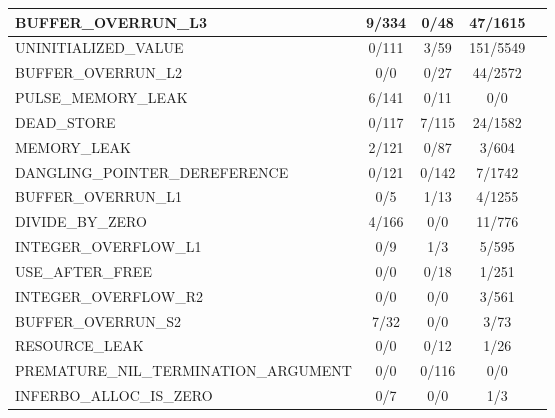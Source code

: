 \begin{table}
\begin{tabular}{!{\vrule width 1pt}l!{\vrule width 1pt}c|c|c!{\vrule width 1pt}c!{\vrule width 1pt}}
         {\scriptsize BUFFER\_OVERRUN\_L3}&  {\footnotesize 9/334}&  {\footnotesize 0/48}&  {\footnotesize 47/1615}\\ \hline
         {\scriptsize UNINITIALIZED\_VALUE}&  {\footnotesize 0/111}&  {\footnotesize 3/59}&  {\footnotesize 151/5549}\\ \hline
         {\scriptsize BUFFER\_OVERRUN\_L2}&  {\footnotesize 0/0}&  {\footnotesize 0/27}&  {\footnotesize 44/2572}\\ \hline
         {\scriptsize PULSE\_MEMORY\_LEAK}&  {\footnotesize 6/141}&  {\footnotesize 0/11}&  {\footnotesize 0/0}\\ \hline
         {\scriptsize DEAD\_STORE}&  {\footnotesize 0/117}&  {\footnotesize 7/115}&  {\footnotesize 24/1582}\\ \hline
         {\scriptsize MEMORY\_LEAK}&  {\footnotesize 2/121}&  {\footnotesize 0/87}&  {\footnotesize 3/604}\\ \hline
         {\scriptsize DANGLING\_POINTER\_DEREFERENCE}&  {\footnotesize 0/121}&  {\footnotesize 0/142}&  {\footnotesize 7/1742}\\ \hline
         {\scriptsize BUFFER\_OVERRUN\_L1}&  {\footnotesize 0/5}&  {\footnotesize 1/13}&  {\footnotesize 4/1255}\\ \hline
         {\scriptsize DIVIDE\_BY\_ZERO}&  {\footnotesize 4/166}&  {\footnotesize 0/0}&  {\footnotesize 11/776}\\ \hline
         {\scriptsize INTEGER\_OVERFLOW\_L1}&  {\footnotesize 0/9}&  {\footnotesize 1/3}&  {\footnotesize 5/595}\\ \hline
         {\scriptsize USE\_AFTER\_FREE}&  {\footnotesize 0/0}&  {\footnotesize 0/18}&  {\footnotesize 1/251}\\ \hline
         {\scriptsize INTEGER\_OVERFLOW\_R2}&  {\footnotesize 0/0}&  {\footnotesize 0/0}&  {\footnotesize 3/561}\\ \hline
         {\scriptsize BUFFER\_OVERRUN\_S2}&  {\footnotesize 7/32}&  {\footnotesize 0/0}&  {\footnotesize 3/73}\\ \hline
         {\scriptsize RESOURCE\_LEAK}&  {\footnotesize 0/0}&  {\footnotesize 0/12}&  {\footnotesize 1/26}\\ \hline
         {\scriptsize PREMATURE\_NIL\_TERMINATION\_ARGUMENT}&  {\footnotesize 0/0}&  {\footnotesize 0/116}&  {\footnotesize 0/0}\\ \hline
         {\scriptsize INFERBO\_ALLOC\_IS\_ZERO}&  {\footnotesize 0/7}&  {\footnotesize 0/0}&  {\footnotesize 1/3}\\ \hline

\end{tabular}
\end{table}
